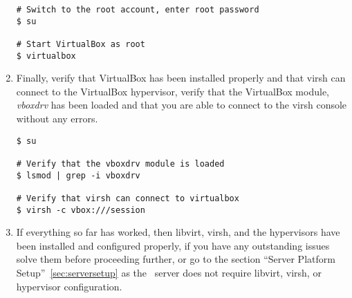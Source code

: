 \begin{enumerate}
\lstset{language=bash,caption=Always Start VirtualBox as Root}
\begin{lstlisting}
# Switch to the root account, enter root password
$ su

# Start VirtualBox as root
$ virtualbox
\end{lstlisting}

\item	Finally, verify that VirtualBox has been installed properly and that virsh can connect to the VirtualBox hypervisor, 
		verify that the VirtualBox module, \emph{vboxdrv} has been loaded and that you are able to connect to the virsh console 
		without any errors.

\lstset{language=bash,caption=Verify that virsh can Access VirtualBox}
\begin{lstlisting}
$ su

# Verify that the vboxdrv module is loaded
$ lsmod | grep -i vboxdrv

# Verify that virsh can connect to virtualbox
$ virsh -c vbox:///session
\end{lstlisting}

\item	If everything so far has worked, then libvirt, virsh, and the hypervisors have been installed and configured properly,
		if you have any outstanding issues solve them before proceeding further, or go to the section ``Server Platform 		
		Setup''~\ref{sec:serversetup} as the \tapper~server does not require libvirt, virsh, or hypervisor configuration.

\end{enumerate}




